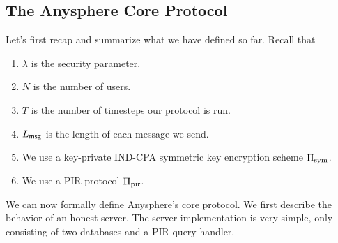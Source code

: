 \subsection{The Anysphere Core Protocol}
Let's first recap and summarize what we have defined so far. Recall that
\begin{enumerate}
    \item $\lambda$ is the security parameter.
    \item $N$ is the number of users.
    \item $T$ is the number of timesteps our protocol is run.
    \item $L_{\mathsf{msg}}$ is the length of each message we send.
    \item We use a key-private IND-CPA symmetric key encryption scheme $\Pi_{\text{sym}}$.
    \item We use a PIR protocol $\Pi_{\text{pir}}$.
\end{enumerate}
We can now formally define Anysphere's core protocol.
\newcommand{\frienddb}{\mathsf{frdb}}
\newcommand{\inb}{\mathsf{in}}
\newcommand{\outb}{\mathsf{out}}
\newcommand{\msgdb}{\mathsf{msgdb}}
\newcommand{\trans}{\mathsf{trans}}
We first describe the behavior of an honest server. The server implementation is very simple, only consisting of two databases and a PIR query handler.
